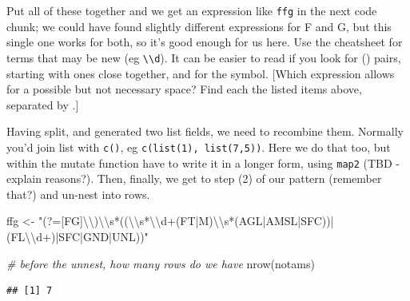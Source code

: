 \documentclass[
]{book}
\newenvironment{Shaded}{\begin{snugshade}}{\end{snugshade}}
\newcommand{\CommentTok}[1]{\textcolor[rgb]{0.56,0.35,0.01}{\textit{#1}}}
\newcommand{\FunctionTok}[1]{\textcolor[rgb]{0.00,0.00,0.00}{#1}}
\newcommand{\NormalTok}[1]{#1}
\newcommand{\OtherTok}[1]{\textcolor[rgb]{0.56,0.35,0.01}{#1}}
\newcommand{\SpecialCharTok}[1]{\textcolor[rgb]{0.00,0.00,0.00}{#1}}
\newcommand{\StringTok}[1]{\textcolor[rgb]{0.31,0.60,0.02}{#1}}
\begin{document}
Put all of these together and we get an expression like \texttt{ffg} in the next code chunk; we could have found slightly different expressions for F and G, but this single one works for both, so it's good enough for us here. Use the cheatsheet for terms that may be new (eg \texttt{\textbackslash{}\textbackslash{}d}). It can be easier to read if you look for () pairs, starting with ones close together, and for the \texttt{\textbar{}} symbol. {[}Which expression allows for a possible but not necessary space? Find each the listed items above, separated by \texttt{\textbar{}}.{]}

Having split, and generated two list fields, we need to recombine them. Normally you'd join list with \texttt{c()}, eg \texttt{c(list(1),\ list(7,5))}. Here we do that too, but within the mutate function have to write it in a longer form, using \texttt{map2} (TBD - explain reasons?). Then, finally, we get to step (2) of our pattern (remember that?) and un-nest into rows.

\begin{Shaded}
\begin{Highlighting}[]
\NormalTok{ffg }\OtherTok{\textless{}{-}} \StringTok{"(?=[FG]}\SpecialCharTok{\textbackslash{}\textbackslash{}}\StringTok{)}\SpecialCharTok{\textbackslash{}\textbackslash{}}\StringTok{s*((}\SpecialCharTok{\textbackslash{}\textbackslash{}}\StringTok{s*}\SpecialCharTok{\textbackslash{}\textbackslash{}}\StringTok{d+(FT|M)}\SpecialCharTok{\textbackslash{}\textbackslash{}}\StringTok{s*(AGL|AMSL|SFC))|(FL}\SpecialCharTok{\textbackslash{}\textbackslash{}}\StringTok{d+)|SFC|GND|UNL))"}

\CommentTok{\# before the unnest, how many rows do we have}
\FunctionTok{nrow}\NormalTok{(notams)}
\end{Highlighting}
\end{Shaded}

\begin{verbatim}
## [1] 7
\end{verbatim}
\end{document}
